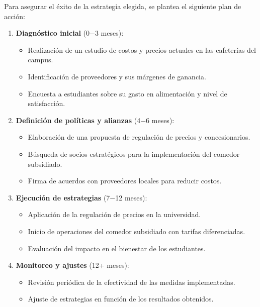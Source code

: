 \documentclass[letterpaper, 11pt]{report}
\begin{document}
Para asegurar el éxito de la estrategia elegida, se plantea el siguiente plan
de acción:

\begin{enumerate}
      \item \textbf{Diagnóstico inicial} (0$-$3 meses):
            \begin{itemize}
                  \item Realización de un estudio de costos y precios actuales en las cafeterías del
                        campus.
                  \item Identificación de proveedores y sus márgenes de ganancia.
                  \item Encuesta a estudiantes sobre su gasto en alimentación y nivel de satisfacción.
            \end{itemize}

      \item \textbf{Definición de políticas y alianzas} (4$-$6 meses):
            \begin{itemize}
                  \item Elaboración de una propuesta de regulación de precios y concesionarios.
                  \item Búsqueda de socios estratégicos para la implementación del comedor subsidiado.
                  \item Firma de acuerdos con proveedores locales para reducir costos.
            \end{itemize}

      \item \textbf{Ejecución de estrategias} (7$-$12 meses):
            \begin{itemize}
                  \item Aplicación de la regulación de precios en la universidad.
                  \item Inicio de operaciones del comedor subsidiado con tarifas diferenciadas.
                  \item Evaluación del impacto en el bienestar de los estudiantes.

            \end{itemize}

      \item \textbf{Monitoreo y ajustes} (12+ meses):

            \begin{itemize}
                  \item Revisión periódica de la efectividad de las medidas implementadas.
                  \item Ajuste de estrategias en función de los resultados obtenidos.
            \end{itemize}
\end{enumerate}
\end{document}
